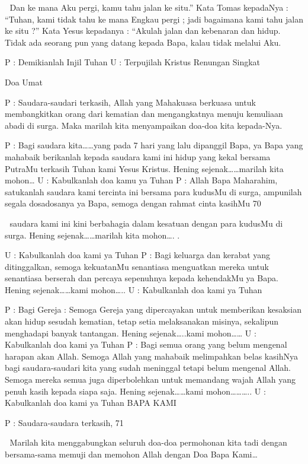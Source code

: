 
Dan ke mana Aku pergi, kamu tahu jalan ke situ.” Kata 
Tomas kepadaNya : “Tuhan, kami tidak tahu ke mana 
Engkau pergi ; jadi bagaimana kami tahu jalan ke situ ?” 
Kata Yesus kepadanya : “Akulah jalan dan kebenaran dan 
hidup. Tidak ada seorang pun yang datang kepada Bapa, 
kalau tidak melalui Aku. 

P 
: Demikianlah Injil Tuhan 
U 
: Terpujilah Kristus 
Renungan Singkat 

Doa Umat 

P 
: Saudara-saudari terkasih, 
Allah yang Mahakuasa berkuasa untuk membangkitkan 
orang dari kematian dan mengangkatnya menuju kemuliaan 
abadi di surga. Maka marilah kita menyampaikan doa-doa 
kita kepada-Nya. 

P 
: Bagi saudara kita……yang pada 7 hari yang lalu dipanggil 
Bapa, ya Bapa yang mahabaik berikanlah kepada saudara 
kami ini hidup yang kekal bersama PutraMu terkasih Tuhan 
kami Yesus Kristus. 
Hening sejenak……marilah kita mohon… 
U 
: Kabulkanlah doa kamu ya Tuhan 
P 
: Allah Bapa Maharahim, satukanlah saudara kami tercinta 
ini bersama para kudusMu di surga, ampunilah segala dosadosanya 
ya Bapa, semoga dengan rahmat cinta kasihMu 
70 



saudara kami ini kini berbahagia dalam kesatuan dengan 
para kudusMu di surga. 
Hening sejenak……marilah kita mohon….
. 


U 
: Kabulkanlah doa kami ya Tuhan 
P : Bagi keluarga dan kerabat yang ditinggalkan, semoga 
kekuatanMu senantiasa menguatkan mereka untuk 
senantiasa berserah dan percaya sepenuhnya kepada 
kehendakMu ya Bapa. 
Hening sejenak……kami mohon….. 
U : Kabulkanlah doa kami ya Tuhan 

P 
: Bagi Gereja : Semoga Gereja yang dipercayakan untuk 
memberikan kesaksian akan hidup sesudah kematian, tetap 
setia melaksanakan misinya, sekalipun menghadapi banyak 
tantangan. 
Hening sejenak…..kami mohon…… 
U 
: Kabulkanlah doa kami ya Tuhan 
P 
: Bagi semua orang yang belum mengenal harapan akan 
Allah. Semoga Allah yang mahabaik melimpahkan belas 
kasihNya bagi saudara-saudari kita yang sudah meninggal 
tetapi belum mengenal Allah. Semoga mereka semua juga 
diperbolehkan untuk memandang wajah Allah yang penuh 
kasih kepada siapa saja. 
Hening sejenak……kami mohon……….. 
U 
: Kabulkanlah doa kami ya Tuhan 
BAPA KAMI 

P : Saudara-saudara terkasih, 
71 



Marilah kita menggabungkan seluruh doa-doa permohonan 
kita tadi dengan bersama-sama memuji dan memohon Allah 
dengan Doa Bapa Kami… 

